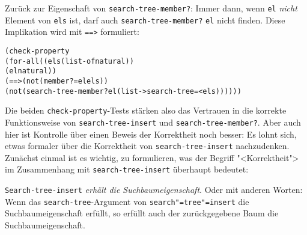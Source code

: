 %
Zurück zur Eigenschaft von \texttt{search-tree-member?}: Immer dann,
wenn \texttt{el} \emph{nicht} Element von \texttt{els} ist, darf auch
\texttt{search-tree-member?} \texttt{el} nicht finden.  Diese
Implikation wird mit \texttt{==>} formuliert:
%
\begin{alltt}
(check-property
 (for-all ((els (list-of natural))
           (el natural))
   (==> (not (member? = el els))
        (not (search-tree-member? el (list->search-tree = < els)))))) 
\end{alltt}
%
Die beiden \texttt{check-property}-Tests stärken also das Vertrauen in
die korrekte Funktionsweise von \texttt{search-tree-insert} und
\texttt{search-tree-member?}.  Aber auch hier ist Kontrolle über einen
Beweis der Korrektheit noch besser:
Es lohnt sich, etwas formaler über die
Korrektheit von \texttt{search-tree-insert} nachzudenken.  Zunächst
einmal ist es wichtig, zu formulieren, was der Begriff "<Korrektheit">
im Zusammenhang mit \texttt{search-tree-insert} überhaupt bedeutet:
%
\begin{satz}\label{satz:suchbaum}
  \texttt{Search-tree-insert} \emph{erhält die Suchbaumeigenschaft}.
  Oder mit anderen Worten: Wenn das \texttt{search-tree}-Argument von
  \texttt{search"=tree"=insert} die Suchbaumeigenschaft erfüllt, so
  erfüllt auch der zurückgegebene Baum die Suchbaumeigenschaft.
\end{satz}
%

